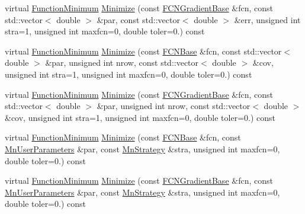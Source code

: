 \begin{DoxyCompactItemize}
\item 
virtual \mbox{\hyperlink{classROOT_1_1Minuit2_1_1FunctionMinimum}{Function\+Minimum}} \mbox{\hyperlink{classROOT_1_1Minuit2_1_1FumiliMinimizer_a2bb7832765e33c24ffad4636ad3b7193}{Minimize}} (const \mbox{\hyperlink{classROOT_1_1Minuit2_1_1FCNGradientBase}{F\+C\+N\+Gradient\+Base}} \&fcn, const std\+::vector$<$ double $>$ \&par, const std\+::vector$<$ double $>$ \&err, unsigned int stra=1, unsigned int maxfcn=0, double toler=0.) const
\item 
virtual \mbox{\hyperlink{classROOT_1_1Minuit2_1_1FunctionMinimum}{Function\+Minimum}} \mbox{\hyperlink{classROOT_1_1Minuit2_1_1FumiliMinimizer_ac2cff69bc8ac1702179b9e17288095a8}{Minimize}} (const \mbox{\hyperlink{classROOT_1_1Minuit2_1_1FCNBase}{F\+C\+N\+Base}} \&fcn, const std\+::vector$<$ double $>$ \&par, unsigned int nrow, const std\+::vector$<$ double $>$ \&cov, unsigned int stra=1, unsigned int maxfcn=0, double toler=0.) const
\item 
virtual \mbox{\hyperlink{classROOT_1_1Minuit2_1_1FunctionMinimum}{Function\+Minimum}} \mbox{\hyperlink{classROOT_1_1Minuit2_1_1FumiliMinimizer_aa17be65e26311aa25f6fd3680f747958}{Minimize}} (const \mbox{\hyperlink{classROOT_1_1Minuit2_1_1FCNGradientBase}{F\+C\+N\+Gradient\+Base}} \&fcn, const std\+::vector$<$ double $>$ \&par, unsigned int nrow, const std\+::vector$<$ double $>$ \&cov, unsigned int stra=1, unsigned int maxfcn=0, double toler=0.) const
\item 
virtual \mbox{\hyperlink{classROOT_1_1Minuit2_1_1FunctionMinimum}{Function\+Minimum}} \mbox{\hyperlink{classROOT_1_1Minuit2_1_1FumiliMinimizer_a22c4059fb94d5e40c843ac90440d2975}{Minimize}} (const \mbox{\hyperlink{classROOT_1_1Minuit2_1_1FCNBase}{F\+C\+N\+Base}} \&fcn, const \mbox{\hyperlink{classROOT_1_1Minuit2_1_1MnUserParameters}{Mn\+User\+Parameters}} \&par, const \mbox{\hyperlink{classROOT_1_1Minuit2_1_1MnStrategy}{Mn\+Strategy}} \&stra, unsigned int maxfcn=0, double toler=0.) const
\item 
virtual \mbox{\hyperlink{classROOT_1_1Minuit2_1_1FunctionMinimum}{Function\+Minimum}} \mbox{\hyperlink{classROOT_1_1Minuit2_1_1FumiliMinimizer_a2b14890a2b40ae8db356b71be505ce66}{Minimize}} (const \mbox{\hyperlink{classROOT_1_1Minuit2_1_1FCNGradientBase}{F\+C\+N\+Gradient\+Base}} \&fcn, const \mbox{\hyperlink{classROOT_1_1Minuit2_1_1MnUserParameters}{Mn\+User\+Parameters}} \&par, const \mbox{\hyperlink{classROOT_1_1Minuit2_1_1MnStrategy}{Mn\+Strategy}} \&stra, unsigned int maxfcn=0, double toler=0.) const
\item 

\end{DoxyCompactItemize}
